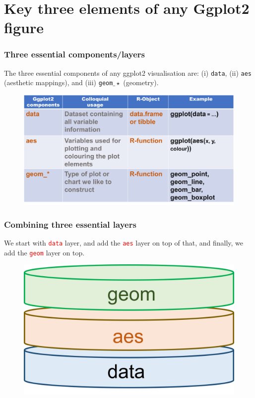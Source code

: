 \documentclass{beamer}
\begin{document}
\section{Key three elements of any Ggplot2 figure}
\begin{frame}\frametitle{Three essential components/layers}
The three essential components of any ggplot2 visualisation are: (i) \texttt{data}, (ii) \texttt{aes} (aesthetic mappings), and (iii) \texttt{geom}$\_\star$ (geometry).
\begin{figure}
\includegraphics[width=0.99\linewidth]{PlotsLec2/MainComponents}
\end{figure}
\end{frame}

\begin{frame}\frametitle{Combining three essential layers}
We start with \textcolor{red}{\texttt{data}} layer, and add the \textcolor{red}{\texttt{aes}} layer on top of that, and finally, we add the \textcolor{red}{\texttt{geom}} layer on top. 
\begin{figure}
\includegraphics[width=0.99\linewidth]{PlotsLec2/GgplotLayers}
\end{figure}
\end{frame}
\end{document}
